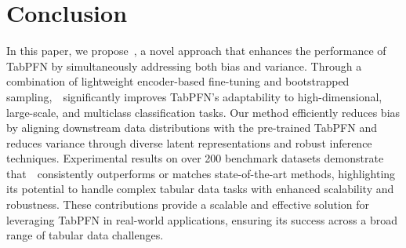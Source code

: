 
\section{Conclusion}
\label{sec:conclusion}
In this paper, we propose~\name, a novel approach that enhances the performance of TabPFN by simultaneously addressing both bias and variance. Through a combination of lightweight encoder-based fine-tuning and bootstrapped sampling,~\name~significantly improves TabPFN’s adaptability to high-dimensional, large-scale, and multiclass classification tasks. Our method efficiently reduces bias by aligning downstream data distributions with the pre-trained TabPFN and reduces variance through diverse latent representations and robust inference techniques. Experimental results on over 200 benchmark datasets demonstrate that~\name~consistently outperforms or matches state-of-the-art methods, highlighting its potential to handle complex tabular data tasks with enhanced scalability and robustness.  These contributions provide a scalable and effective solution for leveraging TabPFN in real-world applications, ensuring its success across a broad range of tabular data challenges.

